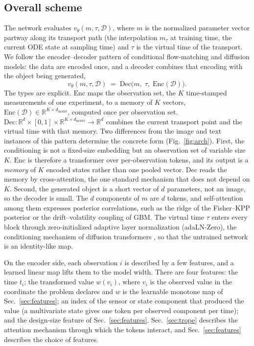\documentclass[10pt]{article}
\newcommand{\D}{\mathcal{D}}
\newcommand{\R}{\mathbb{R}}
\begin{document}
\subsection{Overall scheme}
\label{sec:scheme}

The network evaluates $v_\theta(m, \tau, \D)$, where $m$ is the normalized parameter vector partway
along its transport path (the interpolation $m_\tau$ at training time, the current ODE state at
sampling time) and $\tau$ is the virtual time of the transport. We follow the encoder--decoder pattern
of conditional flow-matching and diffusion models: the data are encoded once, and a decoder combines
that encoding with the object being generated,
\begin{equation}
  v_\theta(m, \tau, \D) \;=\; \mathrm{Dec}\bigl(m,\; \tau,\; \mathrm{Enc}(\D)\bigr).
  \label{eq:encdec}
\end{equation}
The types are explicit. $\mathrm{Enc}$ maps the observation set, the $K$ time-stamped measurements of
one experiment, to a memory of $K$ vectors, $\mathrm{Enc}(\D) \in \R^{K \times d_{\mathrm{model}}}$,
computed once per observation set. $\mathrm{Dec} : \R^{d} \times [0,1] \times \R^{K \times
d_{\mathrm{model}}} \to \R^{d}$ combines the current transport point and the virtual time with that
memory. Two differences from the image and text instances of this pattern determine the concrete form
(Fig.~\ref{fig:arch}). First, the conditioning is not a fixed-size embedding but an observation set of
variable size $K$. $\mathrm{Enc}$ is therefore a transformer over per-observation tokens, and its
output is a \emph{memory} of $K$ encoded states rather than one pooled vector. $\mathrm{Dec}$ reads
the memory by cross-attention, the one standard mechanism that does not depend on $K$. Second, the
generated object is a short vector of $d$ parameters, not an image, so the decoder is small. The $d$
components of $m$ are $d$ tokens, and self-attention among them expresses posterior correlations, such
as the ridge of the Fisher--KPP posterior or the drift--volatility coupling of GBM. The virtual time
$\tau$ enters every block through zero-initialized adaptive layer normalization (adaLN-Zero), the
conditioning mechanism of diffusion transformers \citep{peebles2023}, so that the untrained network is
an identity-like map.

On the encoder side, each observation $i$ is described by a few features, and a learned linear map
lifts them to the model width. There are four features: the time $t_i$; the transformed value
$w(v_i)$, where $v_i$ is the observed value in the coordinate the problem declares and $w$ is the
learnable monotone map of Sec.~\ref{sec:features}; an index of the sensor or state component that
produced the value (a multivariate state gives one token per observed component per time); and the
design-size feature of Sec.~\ref{sec:features}. Sec.~\ref{sec:trope} describes the attention mechanism
through which the tokens interact, and Sec.~\ref{sec:features} describes the choice of features.
\end{document}

